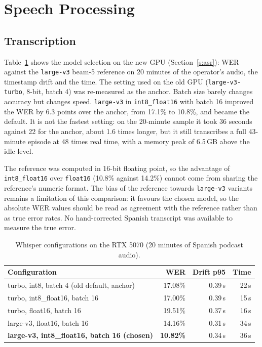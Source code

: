 \section{Speech Processing}
\label{s:res-asr}

\subsection*{Transcription}

Table~\ref{tab:whisper} shows the model selection on the new GPU (Section~\ref{s:asr}): WER against the \texttt{large-v3} beam-5 reference on 20 minutes of the operator's audio, the timestamp drift and the time. The setting used on the old GPU (\texttt{large-v3-turbo}, 8-bit, batch 4) was re-measured as the anchor. Batch size barely changes accuracy but changes speed. \texttt{large-v3} in \texttt{int8\_float16} with batch 16 improved the WER by 6.3 points over the anchor, from 17.1\% to 10.8\%, and became the default. It is not the fastest setting: on the 20-minute sample it took 36 seconds against 22 for the anchor, about 1.6 times longer, but it still transcribes a full 43-minute episode at 48 times real time, with a memory peak of 6.5\,GB above the idle level.

The reference was computed in 16-bit floating point, so the advantage of \texttt{int8\_float16} over \texttt{float16} (10.8\% against 14.2\%) cannot come from sharing the reference's numeric format. The bias of the reference towards \texttt{large-v3} variants remains a limitation of this comparison: it favours the chosen model, so the absolute WER values should be read as agreement with the reference rather than as true error rates. No hand-corrected Spanish transcript was available to measure the true error.

\begin{table}[H]
\centering
\caption{Whisper configurations on the RTX 5070 (20 minutes of Spanish podcast audio).}
\label{tab:whisper}
\small
\begin{tabular}{@{}lrrr@{}}
\toprule
\textbf{Configuration} & \textbf{WER} & \textbf{Drift p95} & \textbf{Time} \\
\midrule
turbo, int8, batch 4 (old default, anchor) & 17.08\% & 0.39\,s & 22\,s \\
turbo, int8\_float16, batch 16 & 17.00\% & 0.39\,s & 15\,s \\
turbo, float16, batch 16 & 19.51\% & 0.37\,s & 16\,s \\
large-v3, float16, batch 16 & 14.16\% & 0.31\,s & 34\,s \\
\textbf{large-v3, int8\_float16, batch 16 (chosen)} & \textbf{10.82\%} & 0.34\,s & 36\,s \\
\bottomrule
\end{tabular}
\end{table}

